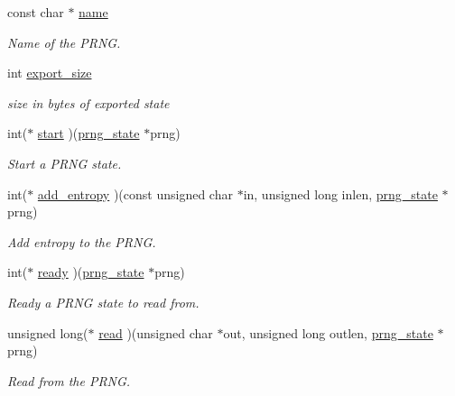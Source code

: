 \begin{DoxyCompactItemize}
\item 
const char $\ast$ \mbox{\hyperlink{structltc__prng__descriptor_a56124a50c35eebe647ae285e14c0d147}{name}}
\begin{DoxyCompactList}\small\item\em Name of the P\+R\+NG. \end{DoxyCompactList}\item 
int \mbox{\hyperlink{structltc__prng__descriptor_a41ef184ab75b213366392faabcde420c}{export\+\_\+size}}
\begin{DoxyCompactList}\small\item\em size in bytes of exported state \end{DoxyCompactList}\item 
int($\ast$ \mbox{\hyperlink{structltc__prng__descriptor_a8a5ccd4e0c8f22ff0bd1778c26de8ab3}{start}} )(\mbox{\hyperlink{structprng__state}{prng\+\_\+state}} $\ast$prng)
\begin{DoxyCompactList}\small\item\em Start a P\+R\+NG state. \end{DoxyCompactList}\item 
int($\ast$ \mbox{\hyperlink{structltc__prng__descriptor_acf1a2cad13724ad580a83b8e6d91bcd2}{add\+\_\+entropy}} )(const unsigned char $\ast$in, unsigned long inlen, \mbox{\hyperlink{structprng__state}{prng\+\_\+state}} $\ast$prng)
\begin{DoxyCompactList}\small\item\em Add entropy to the P\+R\+NG. \end{DoxyCompactList}\item 
int($\ast$ \mbox{\hyperlink{structltc__prng__descriptor_a73162ce704be53c9407ca333ed63d2c0}{ready}} )(\mbox{\hyperlink{structprng__state}{prng\+\_\+state}} $\ast$prng)
\begin{DoxyCompactList}\small\item\em Ready a P\+R\+NG state to read from. \end{DoxyCompactList}\item 
unsigned long($\ast$ \mbox{\hyperlink{structltc__prng__descriptor_a81e69a4cdf51dcb2fe8e6c747d8f2ea0}{read}} )(unsigned char $\ast$out, unsigned long outlen, \mbox{\hyperlink{structprng__state}{prng\+\_\+state}} $\ast$prng)
\begin{DoxyCompactList}\small\item\em Read from the P\+R\+NG. \end{DoxyCompactList}\item 

\end{DoxyCompactItemize}

